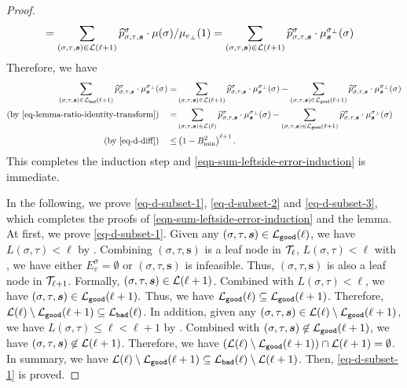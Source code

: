 \documentclass[11pt]{article}
\def\!#1{\mathtt{#1}}
\newcommand{\seqS}{\boldsymbol{s}}
\begin{document}
\begin{proof}
\begin{equation}
\begin{aligned}
    &= \sum_{(\sigma,\tau, \seqS)\in \+L(\ell+1)}\widehat{p}^{\sigma}_{\sigma,\tau,\seqS}\cdot \mu(\sigma)/\mu_{e_{\bot}}(1) =  \sum_{(\sigma,\tau, \seqS)\in \+L(\ell+1)} \widehat{p}^{\sigma}_{\sigma,\tau,\seqS}\cdot \mu^{\sigma_{\bot}}_{\seqS}(\sigma)
\end{aligned}
\end{equation}
Therefore, we have
\begin{align*}
    \sum_{(\sigma,\tau, \seqS)\in \+L_{\!{bad}}(\ell+1)} \widehat{p}^{\sigma}_{\sigma,\tau,\seqS}\cdot \mu^{\sigma_{\bot}}_{\seqS}(\sigma)
    =&\sum_{(\sigma,\tau, \seqS)\in \+L(\ell+1)} \widehat{p}^{\sigma}_{\sigma,\tau,\seqS}\cdot \mu^{\sigma_{\bot}}_{\seqS}(\sigma) - \sum_{(\sigma,\tau, \seqS)\in \+L_{\!{good}}(\ell+1)}\widehat{p}^{\sigma}_{\sigma,\tau,\seqS}\cdot \mu^{\sigma_{\bot}}_{\seqS}(\sigma) \\
\left(\text{by \eqref{eq-lemma-ratio-identity-transform}}\right) \quad      =&\sum_{(\sigma,\tau, \seqS)\in \+L(\ell)} \widehat{p}^{\sigma}_{\sigma,\tau,\seqS}\cdot \mu^{\sigma_{\bot}}_{\seqS}(\sigma) - \sum_{(\sigma,\tau, \seqS)\in \+L_{\!{good}}(\ell+1)}\widehat{p}^{\sigma}_{\sigma,\tau,\seqS}\cdot \mu^{\sigma_{\bot}}_{\seqS}(\sigma)\\
\left(\text{by \eqref{eq-d-diff}}\right) \quad  \leq &\left(1-B_{\min}^2\right)^{\ell+1}.
\end{align*}
This completes the induction step and \eqref{eqn-sum-leftside-error-induction} is immediate.

In the following, we prove \eqref{eq-d-subset-1},  \eqref{eq-d-subset-2} and \eqref{eq-d-subset-3}, which completes the proofs of \eqref{eqn-sum-leftside-error-induction} and the lemma. 
At first, we prove \eqref{eq-d-subset-1}.
Given any $(\sigma,\tau,\seqS) \in \+L_{\!{good}}(\ell)$, we have $L(\sigma,\tau)<\ell$ by .
Combining $(\sigma,\tau,\seqS)$ is a leaf node in $\mathcal{T}_{\ell}$, $L(\sigma,\tau)<\ell$ with ,
we have either $E_v^{\sigma}=\emptyset$ or $(\sigma, \tau, \seqS)$ is infeasible.
Thus, $(\sigma, \tau, \seqS)$ is also a leaf node in $\mathcal{T}_{\ell+1}$.
Formally, $(\sigma,\tau,\seqS)\in \+L(\ell+1)$.
Combined with $L(\sigma,\tau)<\ell$, 
we have 
$(\sigma, \tau, \seqS)\in \+L_{\!{good}}(\ell+1).$
Thus, we have 
$\+L_{\!{good}}(\ell)\subseteq \+L_{\!{good}}(\ell+1)$.
Therefore, 
$\+L(\ell)\setminus \+L_{\!{good}}(\ell+1)\subseteq \+L_{\!{bad}}(\ell)$.
In addition, given any $(\sigma,\tau,\seqS)\in \+L(\ell)\setminus \+L_{\!{good}}(\ell+1)$, we have $L(\sigma,\tau)\leq \ell < \ell+1$ by .
Combined with $(\sigma,\tau,\seqS)\not \in \+L_{\!{good}}(\ell+1)$,
we have $(\sigma,\tau,\seqS)\not\in \+L(\ell+1)$.
Therefore, we have
$(\+L(\ell)\setminus \+L_{\!{good}}(\ell+1))\cap \+L(\ell+1) = \emptyset$.
In summary, we have $\+L(\ell)\setminus \+L_{\!{good}}(\ell+1) \subseteq \+L_{\!{bad}}(\ell)\setminus \+L(\ell+1)$.
Then, \eqref{eq-d-subset-1} is proved.


\end{proof}
\end{document}
